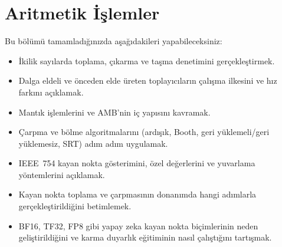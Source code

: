 ﻿%

\chapter{Aritmetik İşlemler}
\label{chap:aritmetik}


\begin{tcolorbox}[
    colframe=sinyalyesil!60!black,
    title={\textbf{Öğrenme Hedefleri}},
    fonttitle=\bfseries,
    rounded corners,
    boxrule=0.8pt
]
Bu bölümü tamamladığınızda aşağıdakileri yapabileceksiniz:
\begin{itemize}[nosep, leftmargin=*]
    \item İkilik sayılarda toplama, çıkarma ve taşma denetimini gerçekleştirmek.
    \item Dalga eldeli ve önceden elde üreten toplayıcıların çalışma ilkesini ve hız farkını açıklamak.
    \item Mantık işlemlerini ve AMB'nin iç yapısını kavramak.
    \item Çarpma ve bölme algoritmalarını (ardışık, Booth, geri yüklemeli/geri yüklemesiz, SRT) adım adım uygulamak.
    \item IEEE~754 kayan nokta gösterimini, özel değerlerini ve yuvarlama yöntemlerini açıklamak.
    \item Kayan nokta toplama ve çarpmasının donanımda hangi adımlarla gerçekleştirildiğini betimlemek.
    \item BF16, TF32, FP8 gibi yapay zeka kayan nokta biçimlerinin neden geliştirildiğini ve karma duyarlık eğitiminin nasıl çalıştığını tartışmak.
\end{itemize}
\end{tcolorbox}

